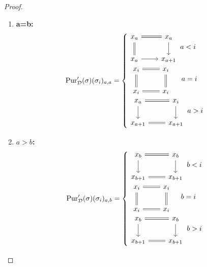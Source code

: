 \documentclass[14pt]{article}
\theoremstyle{definition}
\newcommand{\D}{\mathcal{D}}
\newcommand{\op}[1]{\operatorname{#1}}
\numberwithin{subsection}{section}
\begin{document}
\begin{proof}
\begin{enumerate}
\begin{enumerate}
    \item \textbf{a=b:} 
   \begin{equation}
       \op{Pur}'_{\D}(\sigma)(\sigma_i)_{a,a}= \begin{cases}
           \begin{tikzcd}
               x_a \arrow[r,equal] \arrow[d,equal] & x_a \arrow[d] \\
               x_a \arrow[r] & x_{a+1}
           \end{tikzcd} \, a<i \\ \,\,
            \begin{tikzcd}
               x_i \arrow[r,equal] \arrow[d,equal] & x_i \arrow[d,equal] \\
               x_i \arrow[r,equal] & x_i
           \end{tikzcd} \,\,\,\,\,\,\,\, a=i \\
           \begin{tikzcd}
               x_a \arrow[r,equal] \arrow[d] & x_i \arrow[d] \\
               x_{a+1} \arrow[r,equal] & x_{a+1}
           \end{tikzcd}\, a > i \\
           \end{cases}
   \end{equation}
   \item \textbf{$a>b$:}
   \begin{equation}
       \op{Pur}'_{\D}(\sigma)(\sigma_i)_{a,b}=\begin{cases}
           \begin{tikzcd}
               x_b \arrow[r,equal] \arrow[d] & x_b \arrow[d] \\
               x_{b+1} \arrow[r,equal] & x_{b+1}
           \end{tikzcd} \, b<i \\ \,\,
           \begin{tikzcd}
               x_i \arrow[r,equal] \arrow[d,equal] & x_i \arrow[d,equal] \\
               x_i \arrow[r,equal] & x_i
           \end{tikzcd}\,\,\,\,\,\,\, b=i \\
          \begin{tikzcd}
               x_b \arrow[r,equal] \arrow[d] & x_b \arrow[d] \\
               x_{b+1} \arrow[r,equal] & x_{b+1}
           \end{tikzcd}\, b>i
       \end{cases}

\end{equation}
\end{enumerate}
\end{enumerate}
\end{proof}
\end{document}

